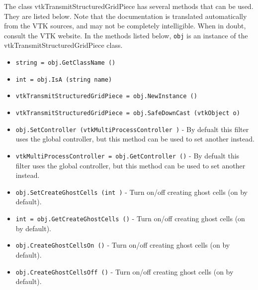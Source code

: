 The class vtkTransmitStructuredGridPiece has several methods that can be used.
  They are listed below.
Note that the documentation is translated automatically from the VTK sources,
and may not be completely intelligible.  When in doubt, consult the VTK website.
In the methods listed below, \verb|obj| is an instance of the vtkTransmitStructuredGridPiece class.
\begin{itemize}
\item  \verb|string = obj.GetClassName ()|

\item  \verb|int = obj.IsA (string name)|

\item  \verb|vtkTransmitStructuredGridPiece = obj.NewInstance ()|

\item  \verb|vtkTransmitStructuredGridPiece = obj.SafeDownCast (vtkObject o)|

\item  \verb|obj.SetController (vtkMultiProcessController )| -  By defualt this filter uses the global controller,
 but this method can be used to set another instead.

\item  \verb|vtkMultiProcessController = obj.GetController ()| -  By defualt this filter uses the global controller,
 but this method can be used to set another instead.

\item  \verb|obj.SetCreateGhostCells (int )| -  Turn on/off creating ghost cells (on by default).

\item  \verb|int = obj.GetCreateGhostCells ()| -  Turn on/off creating ghost cells (on by default).

\item  \verb|obj.CreateGhostCellsOn ()| -  Turn on/off creating ghost cells (on by default).

\item  \verb|obj.CreateGhostCellsOff ()| -  Turn on/off creating ghost cells (on by default).

\end{itemize}
